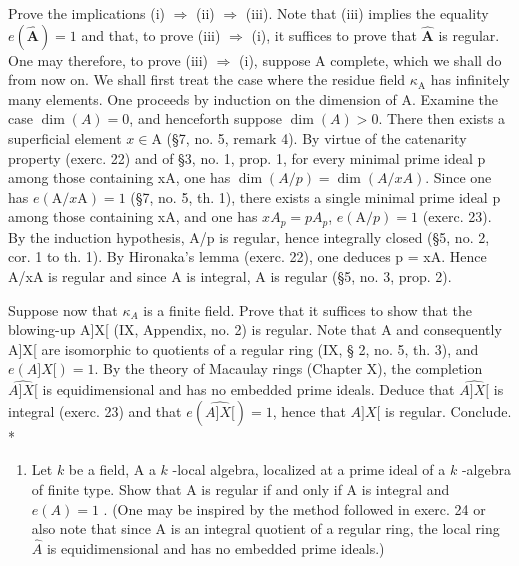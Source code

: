 Prove the implications (i) \(\Rightarrow\) (ii) \(\Rightarrow\) (iii). Note that (iii) implies the equality \(e(\hat{\mathbf{A}}) = 1\) and that, to prove (iii) \(\Rightarrow\) (i), it suffices to prove that \(\hat{\mathbf{A}}\) is regular. One may therefore, to prove (iii) \(\Rightarrow\) (i), suppose A complete, which we shall do from now on. We shall first treat the case where the residue field \(\kappa_{\mathrm{A}}\) has infinitely many elements. One proceeds by induction on the dimension of A. Examine the case \(\dim(A) = 0\), and henceforth suppose \(\dim(A) > 0\). There then exists a superficial element \(x \in \mathrm{A}\) (\S 7, no. 5, remark 4). By virtue of the catenarity property (exerc. 22) and of \S 3, no. 1, prop. 1, for every minimal prime ideal p among those containing xA, one has \(\dim(A/p) = \dim(A/xA)\). Since one has \(e(\mathrm{A}/x\mathrm{A}) = 1\) (\S 7, no. 5, th. 1), there exists a single minimal prime ideal p among those containing xA, and one has \(xA_{p} = pA_{p}\), \(e(\mathrm{A}/p) = 1\) (exerc. 23). By the induction hypothesis, A/p is regular, hence integrally closed (\S 5, no. 2, cor. 1 to th. 1). By Hironaka's lemma (exerc. 22), one deduces p = xA. Hence A/xA is regular and since A is integral, A is regular (\S 5, no. 3, prop. 2).

Suppose now that \(\kappa_{A}\) is a finite field. Prove that it suffices to show that the blowing-up A{]}X{[} (IX, Appendix, no. 2) is regular. Note that A and consequently A{]}X{[} are isomorphic to quotients of a regular ring (IX, § 2, no. 5, th. 3), and \(e(A]X[)=1\). By the theory of Macaulay rings (Chapter X), the completion \(\widehat{A]X[}\) is equidimensional and has no embedded prime ideals. Deduce that \(\widehat{A]X[}\) is integral (exerc. 23) and that \(e(\widehat{A]X[})=1\), hence that \(A]X[\) is regular. Conclude. *

\begin{enumerate}
\def\labelenumi{\arabic{enumi})}
\setcounter{enumi}{24}
\tightlist
\item
  Let \(k\) be a field, A a \(k\) -local algebra, localized at a prime ideal of a \(k\) -algebra of finite type. Show that A is regular if and only if A is integral and \(e(A) = 1\) . (One may be inspired by the method followed in exerc. 24 or also note that since A is an integral quotient of a regular ring, the local ring \(\hat{A}\) is equidimensional and has no embedded prime ideals.)
\end{enumerate}

